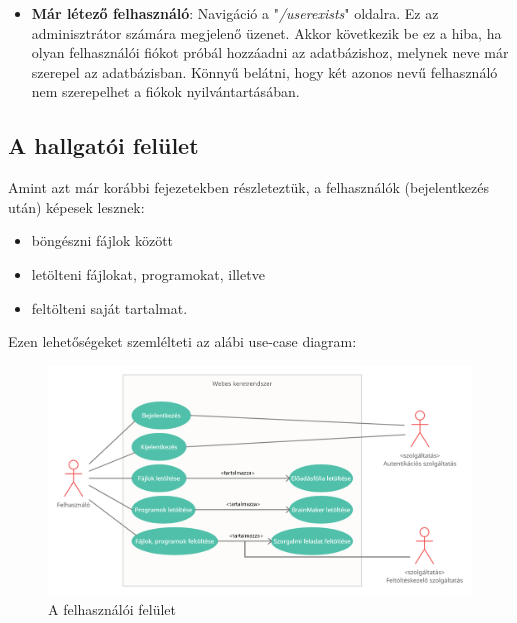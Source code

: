\begin{itemize}
\item{\textbf{Már létező felhasználó}: Navigáció a "\textit{/userexists}" oldalra. Ez az adminisztrátor számára megjelenő üzenet. Akkor következik be ez a hiba, ha olyan felhasználói fiókot próbál hozzáadni az adatbázishoz, melynek neve már szerepel az adatbázisban. Könnyű belátni, hogy két azonos nevű felhasználó nem szerepelhet a fiókok nyilvántartásában.}
\end{itemize}


\subsection{A hallgatói felület}

Amint azt már korábbi fejezetekben részleteztük, a felhasználók (bejelentkezés után) képesek lesznek:

\begin{itemize}
\item{böngészni fájlok között}
\item{letölteni fájlokat, programokat, illetve}
\item{feltölteni saját tartalmat.}
\end{itemize}

Ezen lehetőségeket szemlélteti az alábi use-case diagram:

\begin{figure}[h]
	\centering
		\includegraphics[width=10truecm, height=7truecm]{images/felhasznalo_use_case.png}
	\caption{A felhasználói felület}
	\label{fig:login}
\end{figure}

